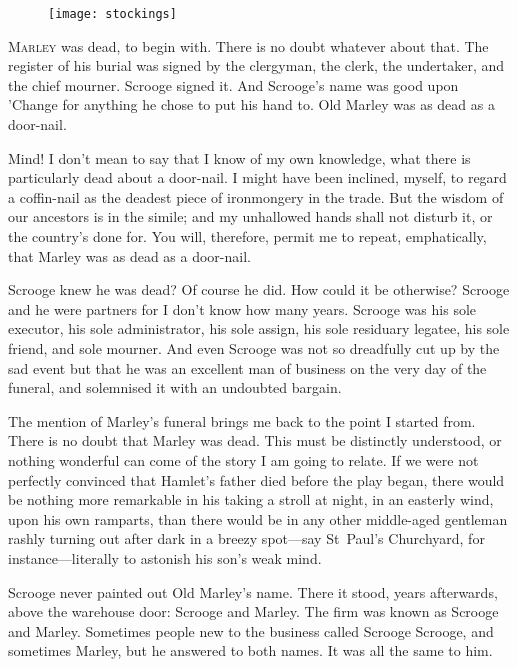 \begin{figure}[h]
\centering
\texttt{[image: stockings]}
\caption[Headpiece to Stave I]{}
\end{figure}
\lettrine[lines=4]{M}{arley} was dead, to begin with. There is no doubt what\-ev\-er about that. The register of his burial was signed by the clergyman, the clerk, the undertaker, and the chief mourner. Scrooge signed it. And Scrooge's name was good upon 'Change for anything he chose to put his hand to. Old Marley was as dead as a door-nail.

Mind! I don't mean to say that I know of my own knowledge, what there is particularly dead about a door-nail. I might have been inclined, myself, to regard a coffin-nail as the deadest piece of ironmongery in the trade. But the wisdom of our ancestors is in the simile; and my unhallowed hands shall not disturb it, or the country's done for. You will, therefore, permit me to repeat, emphatically, that Marley was as dead as a door-nail.

Scrooge knew he was dead? Of course he did. How could it be otherwise? Scrooge and he were partners for I don't know how many years. Scrooge was his sole executor, his sole administrator, his sole assign, his sole residuary legatee, his sole friend, and sole mourner. And even Scrooge was not so dreadfully cut up by the sad event but that he was an excellent man of business on the very day of the funeral, and solemnised it with an undoubted bargain.

The mention of Marley's funeral brings me back to the point I started from. There is no doubt that Marley was dead. This must be distinctly understood, or nothing wonderful can come of the story I am going to relate. If we were not perfectly convinced that Hamlet's father died before the play began, there would be nothing more remarkable in his taking a stroll at night, in an easterly wind, upon his own ramparts, than there would be in any other middle-aged gentleman rashly turning out after dark in a breezy spot---say St~Paul's Churchyard, for instance---literally to astonish his son's weak mind.

Scrooge never painted out Old Marley's name. There it stood, years afterwards, above the warehouse door: Scrooge and Marley. The firm was known as Scrooge and Marley. Sometimes people new to the business called Scrooge Scrooge, and sometimes Marley, but he answered to both names. It was all the same to him.

